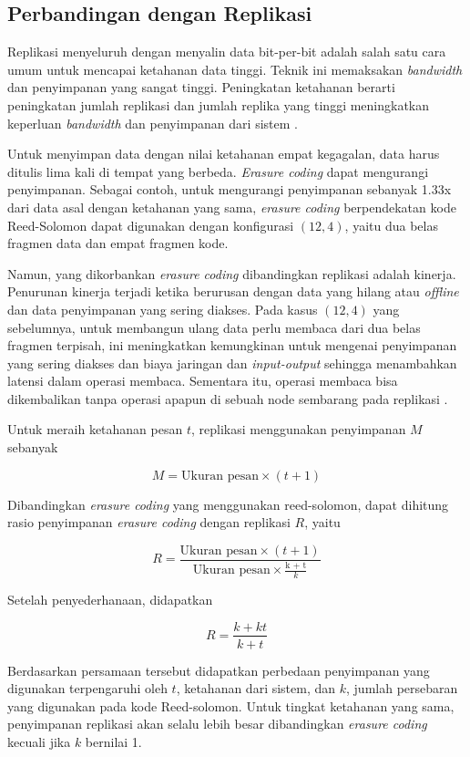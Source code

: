 \subsection{Perbandingan dengan Replikasi}

Replikasi menyeluruh dengan menyalin data bit-per-bit adalah salah satu cara umum untuk mencapai ketahanan data tinggi. Teknik ini memaksakan \textit{bandwidth} dan penyimpanan yang sangat tinggi. Peningkatan ketahanan berarti peningkatan jumlah replikasi dan jumlah replika yang tinggi meningkatkan keperluan \textit{bandwidth} dan penyimpanan dari sistem \parencite{weatherspoon2002erasure}.

Untuk menyimpan data dengan nilai ketahanan empat kegagalan, data harus ditulis lima kali di tempat yang berbeda. \textit{Erasure coding} dapat mengurangi penyimpanan. Sebagai contoh, untuk mengurangi penyimpanan sebanyak 1.33x dari data asal dengan ketahanan yang sama, \textit{erasure coding} berpendekatan kode Reed-Solomon dapat digunakan dengan konfigurasi $(12, 4)$, yaitu dua belas fragmen data dan empat fragmen kode.

Namun, yang dikorbankan \textit{erasure coding} dibandingkan replikasi adalah kinerja. Penurunan kinerja terjadi ketika berurusan dengan data yang hilang atau \textit{offline} dan data penyimpanan yang sering diakses. Pada kasus $(12, 4)$ yang sebelumnya, untuk membangun ulang data perlu membaca dari dua belas fragmen terpisah, ini meningkatkan kemungkinan untuk mengenai penyimpanan yang sering diakses dan biaya jaringan dan \textit{input-output} sehingga menambahkan latensi dalam operasi membaca. Sementara itu, operasi membaca bisa dikembalikan tanpa operasi apapun di sebuah node sembarang pada replikasi \parencite{huang2012erasure}.

Untuk meraih ketahanan pesan $t$, replikasi menggunakan penyimpanan $M$ sebanyak

\[M = \text{Ukuran pesan} \times (t + 1)\]

Dibandingkan \textit{erasure coding} yang menggunakan reed-solomon, dapat dihitung rasio penyimpanan \textit{erasure coding} dengan replikasi $R$, yaitu

\[R = \frac{\text{Ukuran pesan} \times (t + 1)}{\text{Ukuran pesan} \times \frac{\text{k + t}}{k}} \]

Setelah penyederhanaan, didapatkan

\[R = \frac{k + kt}{k + t}\]

Berdasarkan persamaan tersebut didapatkan perbedaan penyimpanan yang digunakan terpengaruhi oleh $t$, ketahanan dari sistem, dan $k$, jumlah persebaran yang digunakan pada kode Reed-solomon. Untuk tingkat ketahanan yang sama, penyimpanan replikasi akan selalu lebih besar dibandingkan \textit{erasure coding} kecuali jika $k$ bernilai 1.
